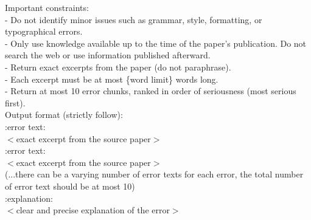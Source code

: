 \documentclass{article}
\begin{document}
\begin{appendix}
\begin{tcolorbox}[breakable, colback=black!5!white,colframe=black!20!white,title=\textbf{\textcolor{black}{Internal-Identification Prompt}}]
    Important constraints:\\
    - Do not identify minor issues such as grammar, style, formatting, or typographical errors.\\
    - Only use knowledge available up to the time of the paper's publication. Do not search the web or use information published afterward.\\
    - Return exact excerpts from the paper (do not paraphrase).\\
    - Each excerpt must be at most \{word limit\} words long.\\
    - Return at most 10 error chunks, ranked in order of seriousness (most serious first).\\
    
    Output format (strictly follow):\\
    
    :error text:\\
    $<$exact excerpt from the source paper$>$\\
    
    :error text:\\
    $<$exact excerpt from the source paper$>$\\
    
    (...there can be a varying number of error texts for each error, the total number of error text should be at most 10)\\
    
    :explanation:\\
    $<$clear and precise explanation of the error$>$
    
    
\end{tcolorbox}


\end{appendix}
\end{document}
